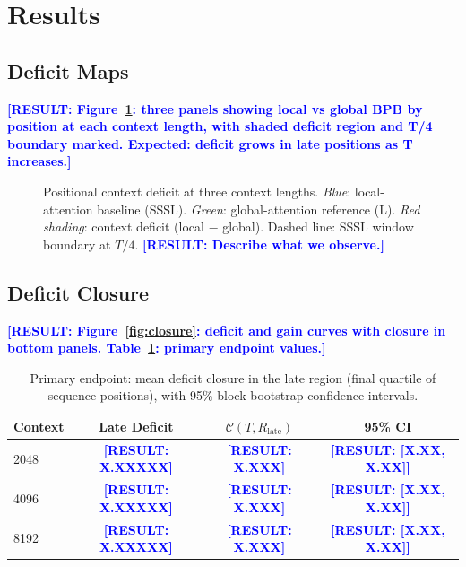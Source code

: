 \documentclass[11pt]{article}
\newcommand{\result}[1]{\textcolor{blue}{\textbf{[RESULT: #1]}}}
\newcommand{\closure}{\mathcal{C}}
\begin{document}
\section{Results}
\label{sec:results}

\subsection{Deficit Maps}

\result{Figure~\ref{fig:deficit_map}: three panels showing
local vs global BPB by position at each context length, with
shaded deficit region and T/4 boundary marked. Expected: deficit
grows in late positions as T increases.}

\begin{figure}[h]
\centering
\caption{Positional context deficit at three context lengths.
  \textit{Blue}: local-attention baseline (SSSL).
  \textit{Green}: global-attention reference (L).
  \textit{Red shading}: context deficit (local $-$ global).
  Dashed line: SSSL window boundary at $T/4$.
  \result{Describe what we observe.}}
\label{fig:deficit_map}
\end{figure}

\subsection{Deficit Closure}

\result{Figure~\ref{fig:closure}: deficit and gain curves with
closure in bottom panels. Table~\ref{tab:closure}: primary
endpoint values.}

\begin{table}[h]
\centering
\caption{Primary endpoint: mean deficit closure in the late region
(final quartile of sequence positions), with 95\% block bootstrap
confidence intervals.}
\label{tab:closure}
\begin{tabular}{lccc}
\toprule
Context & Late Deficit & $\closure(T, R_{\text{late}})$ & 95\% CI \\
\midrule
2048 & \result{X.XXXXX} & \result{X.XXX} & \result{[X.XX, X.XX]} \\
4096 & \result{X.XXXXX} & \result{X.XXX} & \result{[X.XX, X.XX]} \\
8192 & \result{X.XXXXX} & \result{X.XXX} & \result{[X.XX, X.XX]} \\
\bottomrule
\end{tabular}
\end{table}
\end{document}
